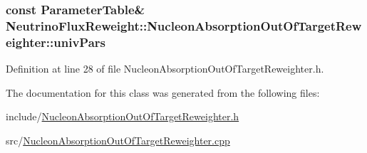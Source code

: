 \hypertarget{class_neutrino_flux_reweight_1_1_nucleon_absorption_out_of_target_reweighter_afc305487c13ad3506ef55909e4e844ac}{
\subsubsection[{univ\-Pars}]{\setlength{\rightskip}{0pt plus 5cm}const {\bf Parameter\-Table}\& Neutrino\-Flux\-Reweight\-::\-Nucleon\-Absorption\-Out\-Of\-Target\-Reweighter\-::univ\-Pars}}\label{class_neutrino_flux_reweight_1_1_nucleon_absorption_out_of_target_reweighter_afc305487c13ad3506ef55909e4e844ac}


Definition at line 28 of file Nucleon\-Absorption\-Out\-Of\-Target\-Reweighter.\-h.



The documentation for this class was generated from the following files\-:\begin{DoxyCompactItemize}
\item 
include/\hyperlink{_nucleon_absorption_out_of_target_reweighter_8h}{Nucleon\-Absorption\-Out\-Of\-Target\-Reweighter.\-h}\item 
src/\hyperlink{_nucleon_absorption_out_of_target_reweighter_8cpp}{Nucleon\-Absorption\-Out\-Of\-Target\-Reweighter.\-cpp}\end{DoxyCompactItemize}

